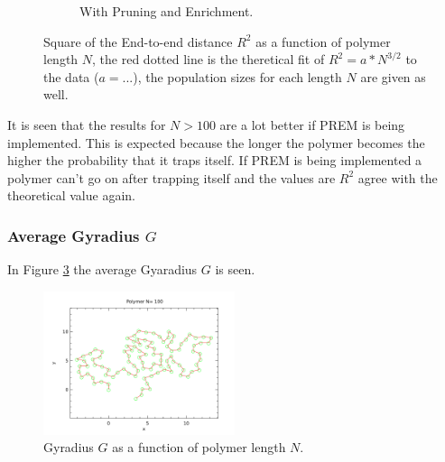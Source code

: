 \begin{figure}[htb]
\begin{subfigure}[b]{0.45\textwidth}
                \caption{With Pruning and Enrichment.}
                \label{fig:etoe_prem}
        \end{subfigure}
        \caption{Square of the End-to-end distance $R^2$ as a function of polymer length $N$, the red dotted line is the theretical fit of $R^2=a*N^{3/2}$ to the data ($a= ...$), the population sizes for each length $N$ are given as well.}
        \label{fig:etoe}
\end{figure}

It is seen that the results for $N>100$ are a lot better if PREM is being implemented. This is expected because the longer the polymer becomes the higher the probability that it traps itself. If PREM is being implemented a polymer can't go on after trapping itself and the values are $R^2$ agree with the theoretical value again. 


\subsubsection*{Average Gyradius $G$}

In Figure \ref{fig:gyradius} the average Gyaradius $G$ is seen.


\begin{figure}[ht!]
\centering
\includegraphics[width=0.5\textwidth]{voorblad.pdf}
\caption{Gyradius $G$ as a function of polymer length $N$.}
\label{fig:gyradius}
\end{figure}
